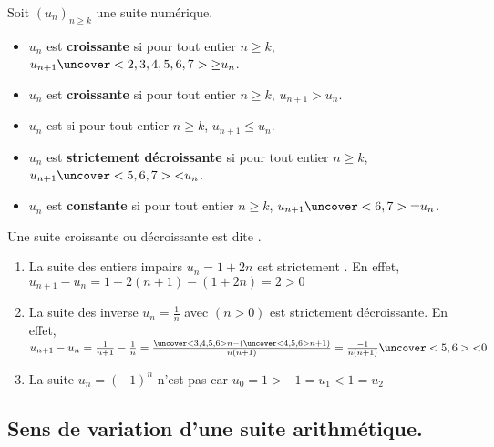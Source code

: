 \documentclass{beamer}
\begin{document}
  \begin{frame}
  \begin{definition}
    
   Soit $(u_n)_{n \geq k}$ une suite numérique.
   
   \begin{itemize}
    \item $u_n$ est \textbf{croissante} si pour tout entier $n \geq k$, $u_{n+1} \uncover<2,3,4,5,6,7>
    {\geq} u_n$.
   \item $u_n$ est \textbf{ croissante} si pour tout entier $n \geq k$, $u_{n+1} > u_n$.
   \item $u_n$ est \textbf{} si pour tout entier $n \geq k$, $u_{n+1} \leq u_n$.
   \item $u_n$ est \textbf{strictement décroissante} si pour tout entier $n \geq k$, 
   $u_{n+1} \uncover<5,6,7>{<} u_n$.
   \item $u_n$ est \textbf{constante} si pour tout entier $n \geq k$, $u_{n+1} \uncover<6,7>{=} u_n$. 
   \end{itemize}
  Une suite croissante ou décroissante est dite \textbf{}.
     
  \end{definition}
  \end{frame}
  
  \begin{frame}
   \begin{example}
    
    \begin{enumerate}
     \item La suite des entiers impairs $u_n=1+2n$ est strictement . En effet, 
     $u_{n+1}-u_n=1+2(n+1)-(1+2n)=2>0$
     \item La suite des inverse $u_n=\frac{1}{n}$ avec $(n>0)$ est strictement décroissante. En effet,
     $u_{n+1}-u_n=\frac{1}{n+1}-\frac{1}{n}=\frac{\uncover<3,4,5,6>{n}-(\uncover<4,5,6>{n+1})}{n(n+1)}=\frac{-1}{n(n+1)}
     \uncover<5,6>{<}0$
     
     \item La suite $u_n=(-1)^n$ n'est pas  car $u_0=1>-1=u_1<1=u_2$
    \end{enumerate}
 \end{example}
 \end{frame}
 
  \subsection{Sens de variation d'une suite arithmétique.}
 
\end{document}
